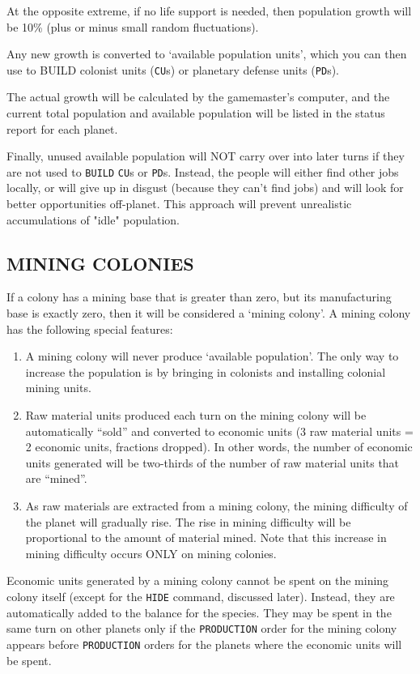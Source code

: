 \documentclass[10pt,titlepage]{article}
\begin{document}
At the opposite extreme, if no life support is needed, then population growth
will be 10\% (plus or minus small random fluctuations).

Any new growth is converted to `available population units', which you can then
use to BUILD colonist units (\texttt{CU}s) or planetary defense units (\texttt{PD}s).

The actual growth will be calculated by the gamemaster's computer, and the
current total population and available population will be listed in the status
report for each planet.

Finally, unused available population will NOT carry over into later turns if
they are not used to \texttt{BUILD} \texttt{CU}s or \texttt{PD}s.  Instead, the people will either find
other jobs locally, or will give up in disgust (because they can't find jobs)
and will look for better opportunities off-planet.  This approach will prevent
unrealistic accumulations of "idle" population.


\subsection{MINING COLONIES}
\label{sec:miningcolonies}


If a colony has a mining base that is greater than zero, but its manufacturing
base is exactly zero, then it will be considered a `mining colony'.  A mining
colony has the following special features:
\begin{enumerate}
	\item A mining colony will never produce `available population'.  The
	only way to increase the population is by bringing in colonists and
	installing colonial mining units.

	\item Raw material units produced each turn on the mining colony will be
	automatically ``sold'' and converted to economic units (3 raw material
	units = 2 economic units, fractions dropped).  In other words, the
	number of economic units generated will be two-thirds of the number
	of raw material units that are ``mined''.

	\item As raw materials are extracted from a mining colony, the mining
	difficulty of the planet will gradually rise.  The rise in mining
	difficulty will be proportional to the amount of material mined.
	Note that this increase in mining difficulty occurs ONLY on mining
	colonies.
\end{enumerate}
Economic units generated by a mining colony cannot be spent on the mining
colony itself (except for the \texttt{HIDE} command, discussed later).  Instead, they
are automatically added to the balance for the species.  They may be spent in
the same turn on other planets only if the \texttt{PRODUCTION} order for the mining
colony appears before \texttt{PRODUCTION} orders for the planets where the economic
units will be spent.
\end{document}
